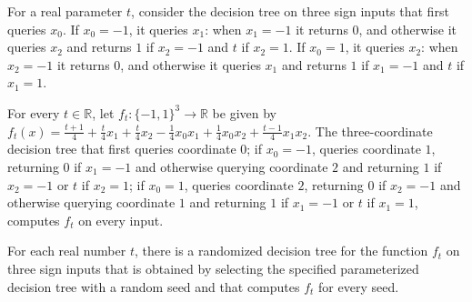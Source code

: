 \begin{definition}
\label{FABL.osssCounterexampleTree}
\leanok
{}
For a real parameter $t$, consider the decision tree on three sign inputs that first
queries $x_0$. If $x_0=-1$, it queries $x_1$: when $x_1=-1$ it returns $0$, and
otherwise it queries $x_2$ and returns $1$ if $x_2=-1$ and $t$ if $x_2=1$. If $x_0=1$,
it queries $x_2$: when $x_2=-1$ it returns $0$, and otherwise it queries $x_1$ and
returns $1$ if $x_1=-1$ and $t$ if $x_1=1$.
\end{definition}

\begin{theorem}
\label{FABL.osssCounterexampleTree_computes}
\leanok
{}
For every $t\in\mathbb R$, let $f_t:\{-1,1\}^3\to\mathbb R$ be given by
$f_t(x)=\frac{t+1}{4}+\frac{t}{4}x_1+\frac{t}{4}x_2-\frac14x_0x_1+\frac14x_0x_2+\frac{t-1}{4}x_1x_2$.
The three-coordinate decision tree that first queries coordinate $0$; if $x_0=-1$,
queries coordinate $1$, returning $0$ if $x_1=-1$ and otherwise querying coordinate $2$
and returning $1$ if $x_2=-1$ or $t$ if $x_2=1$; if $x_0=1$, queries coordinate $2$,
returning $0$ if $x_2=-1$ and otherwise querying coordinate $1$ and returning $1$ if
$x_1=-1$ or $t$ if $x_1=1$, computes $f_t$ on every input.
\end{theorem}

\begin{definition}
\label{FABL.osssCounterexampleRandomizedTreeAt}
\leanok
{}
For each real number $t$, there is a randomized decision tree for the function $f_t$ on
three sign inputs that is obtained by selecting the specified parameterized decision
tree with a random seed and that computes $f_t$ for every seed.
\end{definition}

